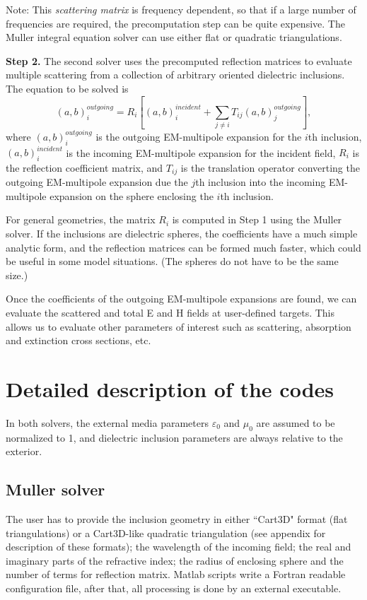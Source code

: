 \documentclass{article}
\begin{document}
Note: This {\em scattering matrix} is frequency dependent,
so that if a large number of frequencies are required, the
precomputation step can be quite expensive. The Muller integral
equation solver can use either flat or quadratic triangulations.

{\bf Step 2.} \hspace{1in} 
The second solver uses the precomputed reflection matrices to evaluate
multiple scattering from a collection of arbitrary oriented dielectric
inclusions. The equation to be solved is
\[
(a,b)^{outgoing}_i = 
   R_i  \left[ (a,b)^{incident}_i + \sum_{j\ne i} T_{ij} (a,b)^{outgoing}_j 
\right],
\]
where $(a,b)^{outgoing}_i$ is the outgoing EM-multipole expansion for
the $i$th inclusion, $(a,b)^{incident}_i$ is the incoming EM-multipole
expansion for the incident field, $R_i$ is the reflection coefficient
matrix, and $T_{ij}$ is the translation operator converting the outgoing
EM-multipole expansion due the $j$th inclusion into the incoming
EM-multipole expansion on the sphere enclosing the $i$th inclusion.

For general geometries, the matrix $R_i$ is computed in Step 1 using the
Muller solver.  If the inclusions are
dielectric spheres, the coefficients have a much simple analytic form,
and the reflection matrices can be formed much faster, which could
be useful in some model situations. 
(The spheres do not have to be the same size.)

Once the coefficients of the outgoing EM-multipole expansions are found,
we can evaluate the scattered and total E and H fields at user-defined
targets. This allows us to evaluate other parameters of interest such
as scattering, absorption and extinction cross sections, etc.


\section{Detailed description of the codes}

In both solvers, the external media parameters $\varepsilon_0$ and $\mu_0$
are assumed to be normalized to 1, and dielectric inclusion parameters
are always relative to the exterior.


\subsection{Muller solver}

The user has to provide the inclusion geometry in 
either ``Cart3D" format (flat triangulations) or a Cart3D-like 
quadratic triangulation (see appendix for
description of these formats); the wavelength of the incoming field;
the real and imaginary parts of the refractive index; the radius of
enclosing sphere and the number of terms for reflection matrix.
Matlab scripts write a Fortran readable configuration file, after
that, all processing is done by an external executable.
\end{document}
